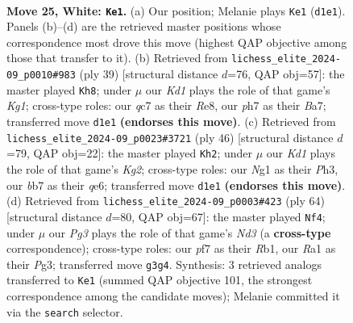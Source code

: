 \documentclass[11pt]{article}
\begin{document}
\begin{figure}[p]
\label{fig:thought-m46}
\end{figure}

\clearpage

\begin{figure}[p]\centering
\begin{subfigure}{0.46\textwidth}\centering
\resizebox{\linewidth}{!}{%
\newchessgame
\chessboard[
  setfen={2r4k/1bqn1p1p/5rp1/pp1Pp3/4P3/1PP3P1/5P1P/R1QK2NR w - - 2 25},
  showmover=false,
  pgfstyle=straightmove, color=movearrow, markmove={d1-e1}
]}
\caption{}
\end{subfigure}\hfill
\begin{subfigure}{0.46\textwidth}\centering
\resizebox{\linewidth}{!}{%
\newchessgame
\chessboard[
  setfen={r2qr1k1/b1p2pp1/p1p4p/4P3/2PpN3/6QP/PP3PP1/3RR1K1 b - - 1 20},
  showmover=false,
  pgfstyle=straightmove, color=movearrow, markmove={g8-h8}
]}
\caption{}
\end{subfigure}
\\[4pt]
\begin{subfigure}{0.46\textwidth}\centering
\resizebox{\linewidth}{!}{%
\newchessgame
\chessboard[
  setfen={1r1r2k1/2p3pp/pp2q3/2p1Pp2/P1P2P2/2PP3P/6K1/1R1QR3 w - - 1 24},
  showmover=false,
  pgfstyle=straightmove, color=movearrow, markmove={g2-h2}
]}
\caption{}
\end{subfigure}\hfill
\begin{subfigure}{0.46\textwidth}\centering
\resizebox{\linewidth}{!}{%
\newchessgame
\chessboard[
  setfen={1r1r2k1/2pqn1p1/2p1pp1p/2P4P/3PP3/1PQN2P1/6K1/1R3R2 w - - 2 33},
  showmover=false,
  pgfstyle=straightmove, color=movearrow, markmove={d3-f4}
]}
\caption{}
\end{subfigure}
\caption{\textbf{Move 25, White: \texttt{Ke1}.} (a) Our position; Melanie plays \texttt{Ke1} (\texttt{d1e1}). Panels (b)--(d) are the retrieved master positions whose correspondence most drove this move (highest QAP objective among those that transfer to it). (b) Retrieved from \texttt{lichess\_elite\_2024-09\_p0010\#983} (ply 39) [structural distance $d$=76, QAP obj=57]: the master played \texttt{Kh8}; under $\mu$ our \emph{Kd1} plays the role of that game's \emph{Kg1}; cross-type roles: our \emph{q}c7 as their \emph{R}e8, our \emph{p}h7 as their \emph{B}a7; transferred move \texttt{d1e1} \textbf{(endorses this move)}. (c) Retrieved from \texttt{lichess\_elite\_2024-09\_p0023\#3721} (ply 46) [structural distance $d$=79, QAP obj=22]: the master played \texttt{Kh2}; under $\mu$ our \emph{Kd1} plays the role of that game's \emph{Kg2}; cross-type roles: our \emph{N}g1 as their \emph{P}h3, our \emph{b}b7 as their \emph{q}e6; transferred move \texttt{d1e1} \textbf{(endorses this move)}. (d) Retrieved from \texttt{lichess\_elite\_2024-09\_p0003\#423} (ply 64) [structural distance $d$=80, QAP obj=67]: the master played \texttt{Nf4}; under $\mu$ our \emph{Pg3} plays the role of that game's \emph{Nd3} (a \textbf{cross-type} correspondence); cross-type roles: our \emph{p}f7 as their \emph{R}b1, our \emph{R}a1 as their \emph{P}g3; transferred move \texttt{g3g4}. Synthesis: 3 retrieved analogs transferred to \texttt{Ke1} (summed QAP objective 101, the strongest correspondence among the candidate moves); Melanie committed it via the \texttt{search} selector.}

\end{figure}
\end{document}
